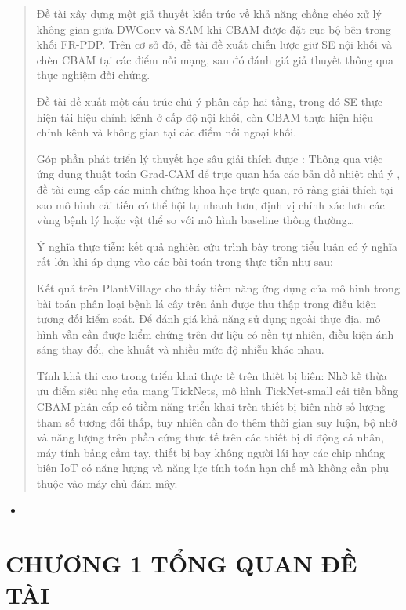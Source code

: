 \documentclass[
  12pt,
  a4paper,
]{report}
\providecommand{\tightlist}{%
  \setlength{\itemsep}{0pt}\setlength{\parskip}{0pt}}
\begin{document}
\begin{quote}
Đề tài xây dựng một giả thuyết kiến trúc về khả năng chồng chéo xử lý
không gian giữa DWConv và SAM khi CBAM được đặt cục bộ bên trong khối
FR-PDP. Trên cơ sở đó, đề tài đề xuất chiến lược giữ SE nội khối và chèn
CBAM tại các điểm nối mạng, sau đó đánh giá giả thuyết thông qua thực
nghiệm đối chứng.

Đề tài đề xuất một cấu trúc chú ý phân cấp hai tầng, trong đó SE thực
hiện tái hiệu chỉnh kênh ở cấp độ nội khối, còn CBAM thực hiện hiệu
chỉnh kênh và không gian tại các điểm nối ngoại khối.

Góp phần phát triển lý thuyết học sâu giải thích được : Thông qua việc
ứng dụng thuật toán Grad-CAM để trực quan hóa các bản đồ nhiệt chú ý ,
đề tài cung cấp các minh chứng khoa học trực quan, rõ ràng giải thích
tại sao mô hình cải tiến có thể hội tụ nhanh hơn, định vị chính xác hơn
các vùng bệnh lý hoặc vật thể so với mô hình baseline thông
thường\ldots{}

Ý nghĩa thực tiễn: kết quả nghiên cứu trình bày trong tiểu luận có ý
nghĩa rất lớn khi áp dụng vào các bài toán trong thực tiễn như sau:

Kết quả trên PlantVillage cho thấy tiềm năng ứng dụng của mô hình trong
bài toán phân loại bệnh lá cây trên ảnh được thu thập trong điều kiện
tương đối kiểm soát. Để đánh giá khả năng sử dụng ngoài thực địa, mô
hình vẫn cần được kiểm chứng trên dữ liệu có nền tự nhiên, điều kiện ánh
sáng thay đổi, che khuất và nhiều mức độ nhiễu khác nhau.

Tính khả thi cao trong triển khai thực tế trên thiết bị biên: Nhờ kế
thừa ưu điểm siêu nhẹ của mạng TickNets, mô hình TickNet-small cải tiến
bằng CBAM phân cấp có tiềm năng triển khai trên thiết bị biên nhờ số
lượng tham số tương đối thấp, tuy nhiên cần đo thêm thời gian suy luận,
bộ nhớ và năng lượng trên phần cứng thực tế trên các thiết bị di động cá
nhân, máy tính bảng cầm tay, thiết bị bay không người lái hay các chip
nhúng biên IoT có năng lượng và năng lực tính toán hạn chế mà không cần
phụ thuộc vào máy chủ đám mây.
\end{quote}

\begin{itemize}
\tightlist
\item
\end{itemize}

\chapter*{CHƯƠNG 1 TỔNG QUAN ĐỀ
TÀI}\label{chux1b0ux1a1ng-1-tux1ed5ng-quan-ux111ux1ec1-tuxe0i}
\end{document}
